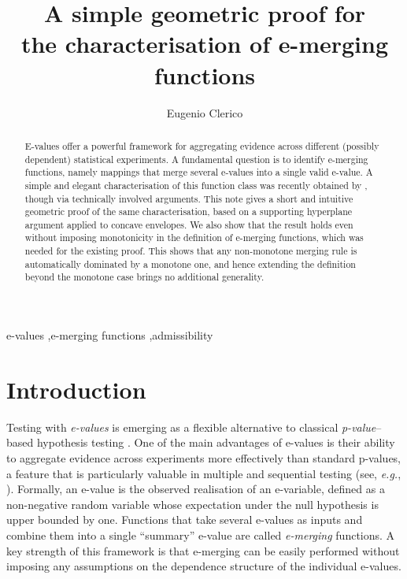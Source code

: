 \documentclass[3p, authoryear, 10pt]{elsarticle}%
\begin{document}
 

\begin{frontmatter}
    \title{A simple geometric proof for\\ the characterisation of e-merging functions} %


    \author[1]{Eugenio Clerico}

    
    
    \begin{abstract} 
        E-values offer a powerful framework for aggregating evidence across different (possibly dependent) statistical experiments. A fundamental question is to identify e-merging functions, namely mappings that merge several e-values into a single valid e-value. A simple and elegant characterisation of this function class was recently obtained by \cite{wang25only}, though via    technically involved arguments. This  note gives a short and intuitive geometric proof of the same characterisation, based on a supporting hyperplane argument applied to concave envelopes. We also show that the result holds even without imposing monotonicity in the definition of e-merging functions, which was needed for the existing proof. This shows that any non-monotone merging rule is automatically dominated by a monotone one, and hence extending the definition beyond the monotone case brings no additional generality.
    \end{abstract}
    \begin{keyword}
            e-values \sep e-merging functions \sep admissibility 
    \end{keyword}
\end{frontmatter}

\section{Introduction}
Testing with \emph{e-values} is emerging as a flexible alternative to classical \emph{p-value}–based hypothesis testing \citep{ramdas2023game}. One of the main advantages of e-values is their ability to aggregate evidence across experiments more effectively than standard p-values, a feature that is particularly valuable in multiple and sequential testing (see, \textit{e.g.}, \citealt{vovk2021evalues,wang2022false,hartog2025family}). Formally, an e-value is the observed realisation of an e-variable, defined as a non-negative random variable whose expectation under the null hypothesis is upper bounded by one. Functions that take several e-values as inputs and combine them into a single ``summary'' e-value are called \emph{e-merging} functions. A key strength of this framework is that e-merging can be easily performed without imposing any assumptions on the dependence structure of the individual e-values.
\end{document}
